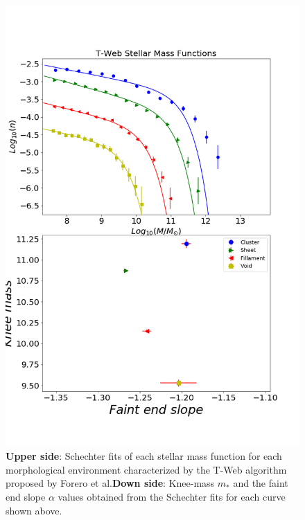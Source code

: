\documentclass[a4paper,fleqn,usenatbib]{mnras}
\begin{document}
\begin{figure}
	\includegraphics[width=\columnwidth]{./pics/T-Web_Stellar.png}
    \caption{\textbf{Upper side}: Schechter fits of each stellar mass
      function for each morphological environment characterized by the
      T-Web algorithm proposed by Forero et al.\textbf{Down side}:
      Knee-mass $m_\ast$ and the faint end slope $\alpha$ values
      obtained from the Schechter fits for each curve shown above.} 
    \label{fig:TwebStellar}
\end{figure}
\end{document}
